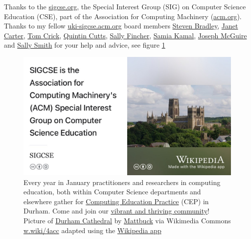 \documentclass[
]{book}
\begin{document}
Thanks to the \href{https://www.sigcse.org}{sigcse.org}, the Special Interest Group (SIG) on Computer Science Education (CSE), part of the Association for Computing Machinery (\href{https://www.acm.org/}{acm.org}). Thanks to my fellow \href{https://uki-sigcse.acm.org/}{uki-sigcse.acm.org} board members \href{https://www.dur.ac.uk/research/directory/staff/?mode=staff\&id=106}{Steven Bradley}, \href{https://www.kent.ac.uk/computing/people/3101/carter-janet}{Janet Carter}, \href{https://proftomcrick.com/}{Tom Crick}, \href{https://www.gla.ac.uk/schools/computing/staff/quintincutts/}{Quintin Cutts}, \href{https://en.wikipedia.org/wiki/Sally_Fincher}{Sally Fincher}, \href{https://www.advance-he.ac.uk/ntfs/dr-samia-kamal}{Samia Kamal}, \href{https://www.gla.ac.uk/schools/computing/staff/josephmaguire/}{Joseph McGuire} and \href{https://www.napier.ac.uk/people/sally-smith}{Sally Smith} for your help and advice, see figure \ref{fig:sigcse-fig}

\begin{figure}

{\centering \includegraphics[width=0.99\linewidth]{images/sigcse} 

}

\caption{Every year in January practitioners and researchers in computing education, both within Computer Science departments and elsewhere gather for \href{https://cepconference.webspace.durham.ac.uk/}{Computing Education Practice} (CEP) in Durham. Come and join our \href{https://uki-sigcse.acm.org/practice/}{vibrant and thriving community}! Picture of \href{https://en.wikipedia.org/wiki/Durham_Cathedral}{Durham Cathedral} by \href{https://commons.wikimedia.org/wiki/User:Mattbuck}{Mattbuck} via Wikimedia Commons \href{https://w.wiki/4acc}{w.wiki/4acc} adapted using the \href{https://apps.apple.com/us/app/wikipedia/id324715238}{Wikipedia app}}\label{fig:sigcse-fig}
\end{figure}
\end{document}
